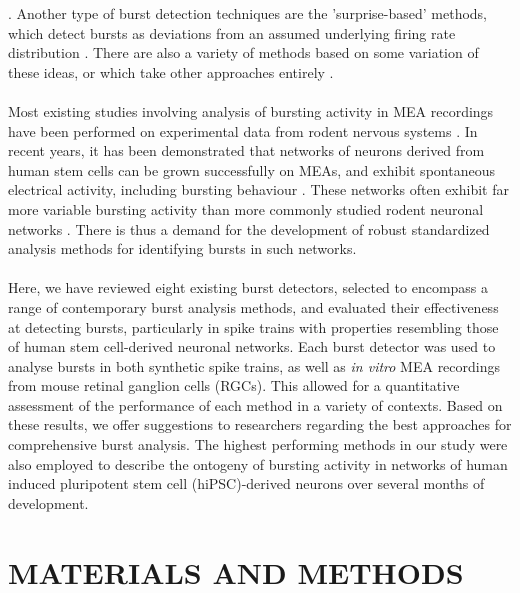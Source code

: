\documentclass[12pt, titlepage]{article}
\begin{document}
	\cite{Cocatre-Zilgien1992,Selinger2007,Pasquale2010,Kaneoke1996,Bakkum2013,Kapucu2012}.
	 Another type of burst detection techniques are the 'surprise-based' methods, which detect bursts as deviations from an assumed underlying firing rate distribution \cite{Legendy1985,Ko2012,Gourevitch2007}. There are also a variety of methods based on some variation of these ideas, or which take other approaches entirely \cite{Hennig2011,Tokdar2010,Turnbull2005,Tam2002,Xia2003,Wagenaar2005,Weihberger2013}.
	\\ \\ Most existing studies involving analysis of bursting activity in MEA recordings have been performed on experimental data from rodent nervous systems \cite{Charlesworth2015,Mazzoni2007}. In recent years, it has been demonstrated that networks of neurons derived from human stem cells can be grown successfully on MEAs, and exhibit spontaneous electrical activity, including bursting behaviour \cite{Odawara2016856,Heikkila2009}. %
	These networks often exhibit far more variable bursting activity than more commonly studied rodent neuronal networks \cite{Kapucu2012}.
	There is thus a demand for the development of robust standardized analysis methods for identifying bursts in such networks.
	\\ \\ Here, we have reviewed eight existing burst detectors, selected to encompass a range of contemporary burst analysis methods, and evaluated their effectiveness at detecting bursts, particularly in spike trains with properties resembling those of human stem cell-derived neuronal networks. Each burst detector was used to analyse bursts in both synthetic spike trains, as well as \textit{in vitro} MEA recordings from mouse retinal ganglion cells (RGCs). This allowed for a quantitative assessment of the performance of each method in a variety of contexts. Based on these results, we offer suggestions to researchers regarding the best approaches for comprehensive burst analysis. The highest performing methods in our study were also employed to describe the ontogeny of bursting activity in networks of human induced pluripotent stem cell (hiPSC)-derived neurons over several months of development. 
	\section*{MATERIALS AND METHODS}
\end{document}
